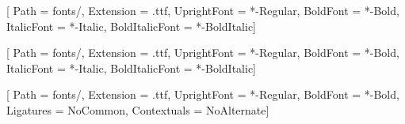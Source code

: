 
\newfontfamily{}[
  Path = fonts/, Extension = .ttf,
  UprightFont = *-Regular, BoldFont = *-Bold,
  ItalicFont  = *-Italic,  BoldItalicFont = *-BoldItalic]

\newfontfamily{}[
  Path = fonts/, Extension = .ttf,
  UprightFont = *-Regular, BoldFont = *-Bold,
  ItalicFont  = *-Italic,  BoldItalicFont = *-BoldItalic]

\newfontfamily{}[
  Path = fonts/, Extension = .ttf,
  UprightFont = *-Regular, BoldFont = *-Bold,
  Ligatures = NoCommon, Contextuals = NoAlternate]
\let\FiraCode\FiraCodeNL

\lstset{mathescape=false}

\gdef\documentlsttitle{Elenco dei listati}
\gdef\documentlstlabel{Listato}



